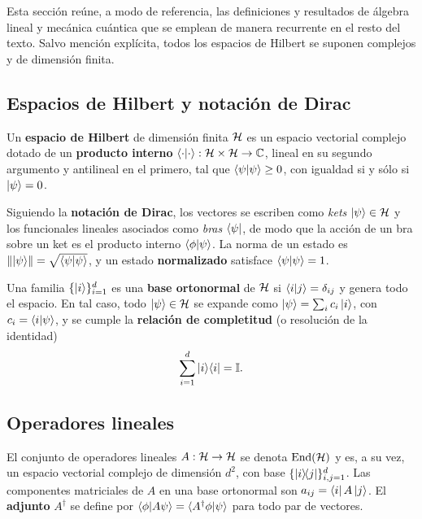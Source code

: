 \documentclass[../main.tex]{subfiles}
\begin{document}
Esta sección reúne, a modo de referencia, las definiciones y resultados de álgebra lineal y mecánica cuántica que se emplean de manera recurrente en el resto del texto. Salvo mención explícita, todos los espacios de Hilbert se suponen complejos y de dimensión finita.

\subsection*{Espacios de Hilbert y notación de Dirac}

\begin{definicion}
Un \textbf{espacio de Hilbert} de dimensión finita $\mathcal{H}$ es un espacio vectorial complejo dotado de un \textbf{producto interno} $\braket{\cdot|\cdot}:\mathcal{H}\times\mathcal{H}\to\mathbb{C}$, lineal en su segundo argumento y antilineal en el primero, tal que $\braket{\psi|\psi}\ge 0$, con igualdad si y sólo si $\ket{\psi}=0$.
\end{definicion}

Siguiendo la \textbf{notación de Dirac}, los vectores se escriben como \emph{kets} $\ket{\psi}\in\mathcal{H}$ y los funcionales lineales asociados como \emph{bras} $\bra{\psi}$, de modo que la acción de un bra sobre un ket es el producto interno $\braket{\phi|\psi}$. La norma de un estado es $\lVert\ket{\psi}\rVert=\sqrt{\braket{\psi|\psi}}$, y un estado \textbf{normalizado} satisface $\braket{\psi|\psi}=1$.

\begin{definicion}
Una familia $\{\ket{i}\}_{i=1}^{d}$ es una \textbf{base ortonormal} de $\mathcal{H}$ si $\braket{i|j}=\delta_{ij}$ y genera todo el espacio. En tal caso, todo $\ket{\psi}\in\mathcal{H}$ se expande como $\ket{\psi}=\sum_i c_i\ket{i}$, con $c_i=\braket{i|\psi}$, y se cumple la \textbf{relación de completitud} (o resolución de la identidad)
\begin{equation*}
    \sum_{i=1}^{d}\ket{i}\!\bra{i}=\mathbb{I}.
\end{equation*}
\end{definicion}

\subsection*{Operadores lineales}

El conjunto de operadores lineales $A:\mathcal{H}\to\mathcal{H}$ se denota $\operatorname{End}(\mathcal{H})$ y es, a su vez, un espacio vectorial complejo de dimensión $d^2$, con base $\{\ketbra{i}{j}\}_{i,j=1}^{d}$. Las componentes matriciales de $A$ en una base ortonormal son $a_{ij}=\bra{i}A\ket{j}$. El \textbf{adjunto} $A^\dagger$ se define por $\braket{\phi|A\psi}=\braket{A^\dagger\phi|\psi}$ para todo par de vectores.
\end{document}
